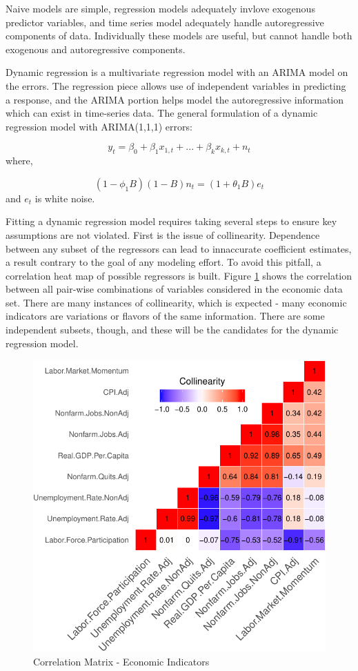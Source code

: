 \documentclass[12pt,letterpaper,toc=flat,oneside]{report}
\theoremstyle{definition}
\theoremstyle{definition}
\theoremstyle{definition}
\theoremstyle{remark}
\begin{document}
Naive models are simple, regression models adequately invlove exogenous
predictor variables, and time series model adequately handle
autoregressive components of data. Individually these models are useful,
but cannot handle both exogenous and autoregressive components.

Dynamic regression is a multivariate regression model with an ARIMA
model on the errors. The regression piece allows use of independent
variables in predicting a response, and the ARIMA portion helps model
the autoregressive information which can exist in time-series data. The
general formulation of a dynamic regression model with ARIMA(1,1,1)
errors:

\[ y_t = \beta_0 + \beta_1x_{1,t} + ... + \beta_kx_{k,t} + n_t\] where,

\[ (1-\phi_1B)(1-B)n_t = (1+\theta_1B)e_t \] and \(e_t\) is white noise.

Fitting a dynamic regression model requires taking several steps to
ensure key assumptions are not violated. First is the issue of
collinearity. Dependence between any subset of the regressors can lead
to innaccurate coefficient estimates, a result contrary to the goal of
any modeling effort. To avoid this pitfall, a correlation heat map of
possible regressors is built. Figure \ref{fig:heat-map-1} shows the
correlation between all pair-wise combinations of variables considered
in the economic data set. There are many instances of collinearity,
which is expected - many economic indicators are variations or flavors
of the same information. There are some independent subsets, though, and
these will be the candidates for the dynamic regression model.

\begin{figure}[H]

{\centering \includegraphics{elliott-econometric-personnel-retention-18_files/figure-latex/heat-map-1-1} 

}

\caption{Correlation Matrix - Economic Indicators}\label{fig:heat-map-1}
\end{figure}
\end{document}
